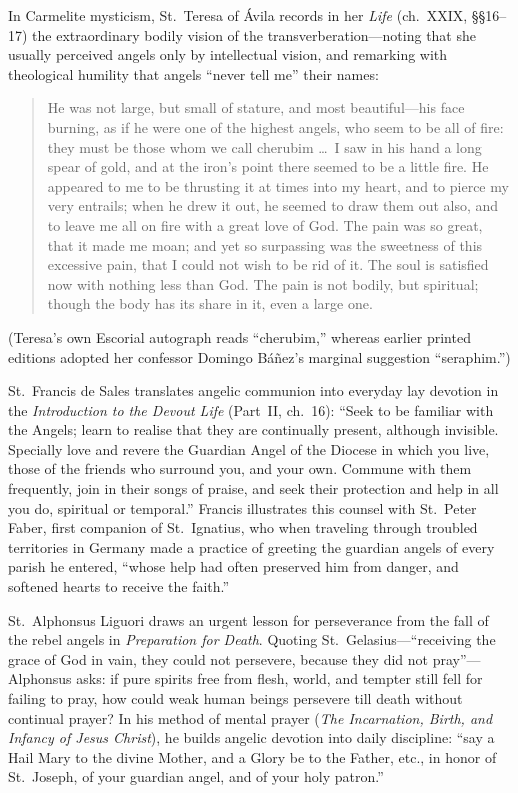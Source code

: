 In Carmelite mysticism, St.~Teresa of \'Avila records in her \emph{Life} (ch.~XXIX, \S\S16--17) the extraordinary bodily vision of the transverberation---noting that she usually perceived angels only by intellectual vision, and remarking with theological humility that angels ``never tell me'' their names:

\begin{quotation}
He was not large, but small of stature, and most beautiful---his face burning, as if he were one of the highest angels, who seem to be all of fire: they must be those whom we call cherubim \dots\ I saw in his hand a long spear of gold, and at the iron's point there seemed to be a little fire. He appeared to me to be thrusting it at times into my heart, and to pierce my very entrails; when he drew it out, he seemed to draw them out also, and to leave me all on fire with a great love of God. The pain was so great, that it made me moan; and yet so surpassing was the sweetness of this excessive pain, that I could not wish to be rid of it. The soul is satisfied now with nothing less than God. The pain is not bodily, but spiritual; though the body has its share in it, even a large one.
\end{quotation}

(Teresa's own Escorial autograph reads ``cherubim,'' whereas earlier printed editions adopted her confessor Domingo B\'a\~nez's marginal suggestion ``seraphim.'')

St.~Francis de Sales translates angelic communion into everyday lay devotion in the \emph{Introduction to the Devout Life} (Part~II, ch.~16): ``Seek to be familiar with the Angels; learn to realise that they are continually present, although invisible. Specially love and revere the Guardian Angel of the Diocese in which you live, those of the friends who surround you, and your own. Commune with them frequently, join in their songs of praise, and seek their protection and help in all you do, spiritual or temporal.'' Francis illustrates this counsel with St.~Peter Faber, first companion of St.~Ignatius, who when traveling through troubled territories in Germany made a practice of greeting the guardian angels of every parish he entered, ``whose help had often preserved him from danger, and softened hearts to receive the faith.''

St.~Alphonsus Liguori draws an urgent lesson for perseverance from the fall of the rebel angels in \emph{Preparation for Death}. Quoting St.~Gelasius---``receiving the grace of God in vain, they could not persevere, because they did not pray''---Alphonsus asks: if pure spirits free from flesh, world, and tempter still fell for failing to pray, how could weak human beings persevere till death without continual prayer? In his method of mental prayer (\emph{The Incarnation, Birth, and Infancy of Jesus Christ}), he builds angelic devotion into daily discipline: ``say a Hail Mary to the divine Mother, and a Glory be to the Father, etc., in honor of St.~Joseph, of your guardian angel, and of your holy patron.''

